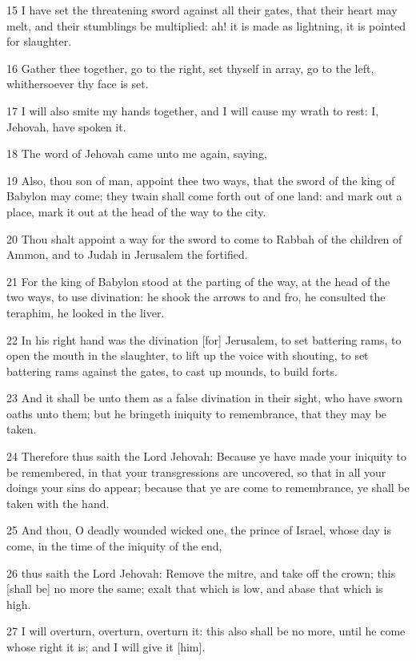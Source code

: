 \par 15 I have set the threatening sword against all their gates, that their heart may melt, and their stumblings be multiplied: ah! it is made as lightning, it is pointed for slaughter.
\par 16 Gather thee together, go to the right, set thyself in array, go to the left, whithersoever thy face is set.
\par 17 I will also smite my hands together, and I will cause my wrath to rest: I, Jehovah, have spoken it.
\par 18 The word of Jehovah came unto me again, saying,
\par 19 Also, thou son of man, appoint thee two ways, that the sword of the king of Babylon may come; they twain shall come forth out of one land: and mark out a place, mark it out at the head of the way to the city.
\par 20 Thou shalt appoint a way for the sword to come to Rabbah of the children of Ammon, and to Judah in Jerusalem the fortified.
\par 21 For the king of Babylon stood at the parting of the way, at the head of the two ways, to use divination: he shook the arrows to and fro, he consulted the teraphim, he looked in the liver.
\par 22 In his right hand was the divination [for] Jerusalem, to set battering rams, to open the mouth in the slaughter, to lift up the voice with shouting, to set battering rams against the gates, to cast up mounds, to build forts.
\par 23 And it shall be unto them as a false divination in their sight, who have sworn oaths unto them; but he bringeth iniquity to remembrance, that they may be taken.
\par 24 Therefore thus saith the Lord Jehovah: Because ye have made your iniquity to be remembered, in that your transgressions are uncovered, so that in all your doings your sins do appear; because that ye are come to remembrance, ye shall be taken with the hand.
\par 25 And thou, O deadly wounded wicked one, the prince of Israel, whose day is come, in the time of the iniquity of the end,
\par 26 thus saith the Lord Jehovah: Remove the mitre, and take off the crown; this [shall be] no more the same; exalt that which is low, and abase that which is high.
\par 27 I will overturn, overturn, overturn it: this also shall be no more, until he come whose right it is; and I will give it [him].
